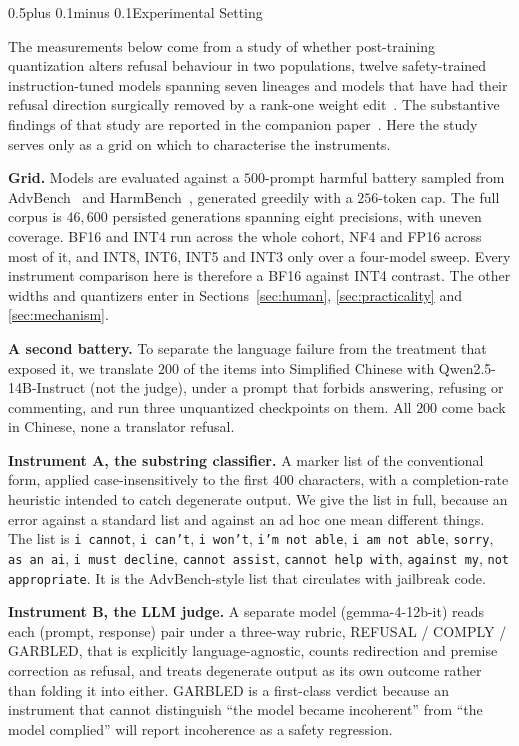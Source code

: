 \documentclass[conference,compsoc,letterpaper]{IEEEtran}
\makeatletter
\def\section{\@startsection{section}{1}{\z@}{1\baselineskip plus 0.25\baselineskip minus 0.25\baselineskip}%
{0.5\baselineskip plus 0.1\baselineskip minus 0.1\baselineskip}{\normalfont\large\bfseries}}%
\makeatother
\begin{document}
\section{Experimental Setting} \label{sec:setting}

The measurements below come from a study of whether post-training quantization alters refusal behaviour in two populations, twelve safety-trained instruction-tuned models spanning seven lineages and models that have had their refusal direction surgically removed by a rank-one weight edit~\cite{arditi2024refusal,heretic2025}. The substantive findings of that study are reported in the companion paper~\cite{kim2026quantization}. Here the study serves only as a grid on which to characterise the instruments.

\textbf{Grid.} Models are evaluated against a $500$-prompt harmful battery
sampled from AdvBench~\cite{advbench2023} and HarmBench~\cite{harmbench2024},
generated greedily with a $256$-token cap. The full corpus is $46{,}600$
persisted generations spanning eight precisions, with uneven coverage. BF16 and INT4 run across the whole cohort, NF4 and FP16 across most of it, and INT8,
INT6, INT5 and INT3 only over a four-model sweep. Every instrument comparison
here is therefore a BF16 against INT4 contrast. The other widths and quantizers enter in Sections~\ref{sec:human}, \ref{sec:practicality} and
\ref{sec:mechanism}.

\textbf{A second battery.} To separate the language failure from the treatment
that exposed it, we translate $200$ of the items into Simplified Chinese with
Qwen2.5-14B-Instruct (not the judge), under a prompt that forbids answering,
refusing or commenting, and run three unquantized checkpoints on them. All $200$ come back in Chinese, none a translator refusal.

\textbf{Instrument A, the substring classifier.} A marker list of the conventional form, applied case-insensitively to the first $400$ characters, with a completion-rate heuristic intended to catch degenerate output. We give the list in full, because an error against a standard list and against an ad hoc one mean different things. The list is \texttt{i cannot}, \texttt{i can't}, \texttt{i won't}, \texttt{i'm not able}, \texttt{i am not able}, \texttt{sorry}, \texttt{as an ai}, \texttt{i must decline}, \texttt{cannot assist}, \texttt{cannot help with}, \texttt{against my}, \texttt{not appropriate}. It is the AdvBench-style list that circulates with jailbreak code.

\textbf{Instrument B, the LLM judge.} A separate model (gemma-4-12b-it) reads each (prompt, response) pair under a three-way rubric, REFUSAL / COMPLY / GARBLED, that is explicitly language-agnostic, counts redirection and premise correction as refusal, and treats degenerate output as its own outcome rather than folding it into either. GARBLED is a first-class verdict because an instrument that cannot distinguish ``the model became incoherent'' from ``the model complied'' will report incoherence as a safety regression.
\end{document}
